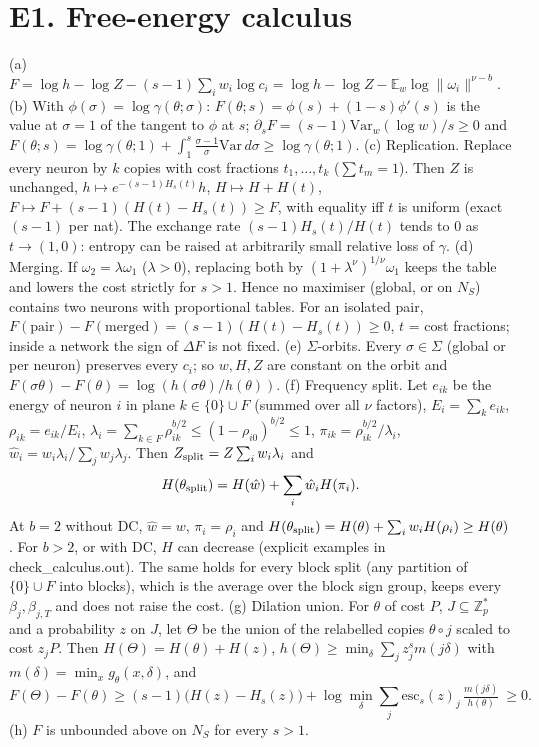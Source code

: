 \documentclass[11pt]{article}
\theoremstyle{remark}\newtheorem{remark}[theorem]{Remark}
\begin{document}
\section{E1. Free-energy calculus}
\begin{proposition}\label{p:calc}
(a) $F=\log h-\log Z-(s-1)\sum_iw_i\log c_i=\log h-\log Z-\mathbb E_w\log\|\omega_i\|^{\nu-b}$.
(b) With $\phi(\sigma)=\log\gamma(\theta;\sigma)$: $F(\theta;s)=\phi(s)+(1-s)\phi'(s)$ is the value at $\sigma=1$ of the tangent to $\phi$ at $s$;
$\partial_sF=(s-1)\mathrm{Var}_w(\log w)/s\ge0$ and $F(\theta;s)=\log\gamma(\theta;1)+\int_1^s\frac{\sigma-1}\sigma\mathrm{Var}\,d\sigma\ge\log\gamma(\theta;1)$.
(c) Replication. Replace every neuron by $k$ copies with cost fractions $t_1,\dots,t_k$ ($\sum t_m=1$). Then $Z$ is unchanged,
$h\mapsto e^{-(s-1)H_s(t)}h$, $H\mapsto H+H(t)$, $F\mapsto F+(s-1)(H(t)-H_s(t))\ge F$, with equality iff $t$ is uniform (exact $(s-1)$ per nat).
The exchange rate $(s-1)H_s(t)/H(t)$ tends to $0$ as $t\to(1,0)$: entropy can be raised at arbitrarily small relative loss of $\gamma$.
(d) Merging. If $\omega_2=\lambda\omega_1$ ($\lambda>0$), replacing both by $(1+\lambda^\nu)^{1/\nu}\omega_1$ keeps the table and lowers the cost
strictly for $s>1$. Hence no maximiser (global, or on $N_S$) contains two neurons with proportional tables. For an isolated pair,
$F(\text{pair})-F(\text{merged})=(s-1)(H(t)-H_s(t))\ge0$, $t$ = cost fractions; inside a network the sign of $\Delta F$ is not fixed.
(e) $\Sigma$-orbits. Every $\sigma\in\Sigma$ (global or per neuron) preserves every $c_i$; so $w,H,Z$ are constant on the orbit and
$F(\sigma\theta)-F(\theta)=\log(h(\sigma\theta)/h(\theta))$.
(f) Frequency split. Let $e_{ik}$ be the energy of neuron $i$ in plane $k\in\{0\}\cup F$ (summed over all $\nu$ factors), $E_i=\sum_ke_{ik}$,
$\rho_{ik}=e_{ik}/E_i$, $\lambda_i=\sum_{k\in F}\rho_{ik}^{b/2}\le(1-\rho_{i0})^{b/2}\le1$, $\pi_{ik}=\rho_{ik}^{b/2}/\lambda_i$,
$\hat w_i=w_i\lambda_i/\sum_jw_j\lambda_j$. Then $Z_{\rm split}=Z\sum_iw_i\lambda_i$ and
\[H(\theta_{\rm split})=H(\hat w)+\sum_i\hat w_iH(\pi_i).\]
At $b=2$ without DC, $\hat w=w$, $\pi_i=\rho_i$ and $H(\theta_{\rm split})=H(\theta)+\sum_iw_iH(\rho_i)\ge H(\theta)$.
For $b>2$, or with DC, $H$ can decrease (explicit examples in check\_calculus.out). The same holds for every block split
(any partition of $\{0\}\cup F$ into blocks), which is the average over the block sign group, keeps every $\beta_j,\beta_{j,T}$ and does not raise the cost.
(g) Dilation union. For $\theta$ of cost $P$, $J\subseteq\mathbb Z_p^*$ and a probability $z$ on $J$, let $\Theta$ be the union of the relabelled copies
$\theta\circ j$ scaled to cost $z_jP$. Then $H(\Theta)=H(\theta)+H(z)$, $h(\Theta)\ge\min_\delta\sum_jz_j^sm(j\delta)$ with $m(\delta)=\min_xg_\theta(x,\delta)$, and
\[F(\Theta)-F(\theta)\ge(s-1)\big(H(z)-H_s(z)\big)+\log\min_\delta\sum_j\mathrm{esc}_s(z)_j\,\tfrac{m(j\delta)}{h(\theta)}\ \ge0 .\]
(h) $F$ is unbounded above on $N_S$ for every $s>1$.
\end{proposition}
\end{document}
